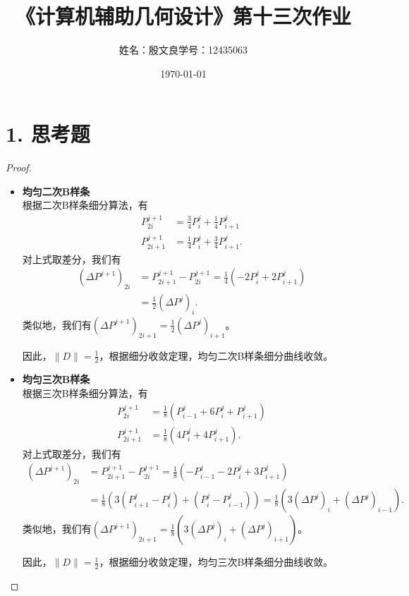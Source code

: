 \documentclass[utf8]{ctexart}
\title{《计算机辅助几何设计》第十三次作业}
\author{姓名：殷文良\qquad 学号：12435063}
\date{\today}
\begin{document}
\maketitle
{}

\section*{1. 思考题}
\begin{proof}
    \begin{itemize}
        \item \textbf{均匀二次B样条}\\
        根据二次B样条细分算法，有
        $$
        \begin{aligned}
            P_{2i}^{j+1} &= \frac{3}{4}P_i^j+\frac{1}{4}P_{i+1}^j\\
            P_{2i+1}^{j+1} &= \frac{1}{4}P_{i}^j + \frac{3}{4}P_{i+1}^j.
        \end{aligned}
        $$
        对上式取差分，我们有
        $$
        \begin{aligned}
            (\Delta P^{j+1})_{2i} &= P_{2i+1}^{j+1} - P_{2i}^{j+1} = \frac{1}{4}(-2P_{i}^j+2P_{i+1}^{j})\\
            &= \frac{1}{2}(\Delta P^j)_i.
        \end{aligned}
        $$
        类似地，我们有$(\Delta P^{j+1})_{2i+1} = \frac{1}{2}(\Delta P^j)_{i+1}$。\par
        因此，$\|D\| = \frac{1}{2}$，根据细分收敛定理，均匀二次B样条细分曲线收敛。
        \item \textbf{均匀三次B样条}\\
        根据三次B样条细分算法，有
        $$
        \begin{aligned}
            P_{2i}^{j+1} &= \frac{1}{8}(P_{i-1}^j + 6P_i^j + P_{i+1}^j)\\
            P_{2i+1}^{j+1} &= \frac{1}{8}(4P_i^j+4P_{i+1}^j).
        \end{aligned}
        $$
        对上式取差分，我们有
        $$
        \begin{aligned}
            (\Delta P^{j+1})_{2i} &= P_{2i+1}^{j+1} - P_{2i}^{j+1} = \frac{1}{8}(-P_{i-1}^j-2P_{i}^{j}+3P_{i+1}^{j})\\
            &= \frac{1}{8}(3(P_{i+1}^j-P_i^j) + (P_{i}^j-P_{i-1}^j)) = \frac{1}{8}(3(\Delta P^j)_{i} + (\Delta P^j)_{i-1}).
        \end{aligned}
        $$
        类似地，我们有$(\Delta P^{j+1})_{2i+1} = \frac{1}{8}(3(\Delta P^j)_{i} + (\Delta P^j)_{i+1})$。\par
        因此，$\|D\| = \frac{1}{2}$，根据细分收敛定理，均匀三次B样条细分曲线收敛。
    \end{itemize}
\end{proof}
\end{document}
